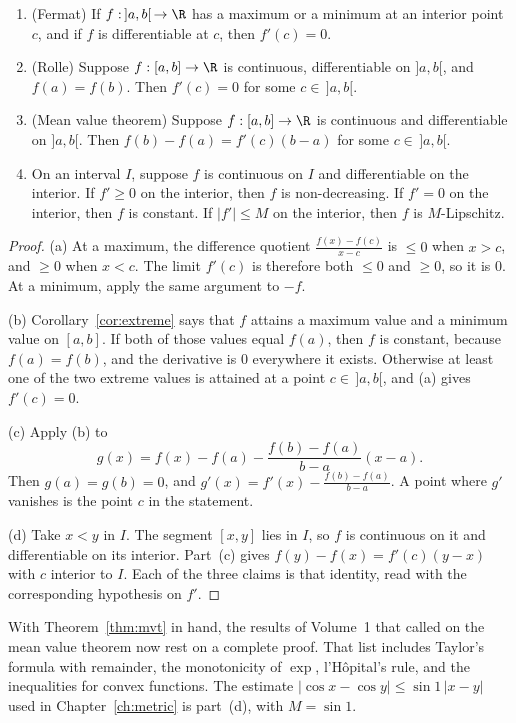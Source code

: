 \begin{theorem}\label{thm:mvt}
\begin{enumerate}[label=(\alph*)]
\item (Fermat) If $f:\,]a,b[\,\to\R$ has a maximum or a minimum at an interior point $c$, and if $f$ is differentiable at $c$, then $f'(c)=0$.
\item (Rolle) Suppose $f:[a,b]\to\R$ is continuous, differentiable on $]a,b[$, and $f(a)=f(b)$. Then $f'(c)=0$ for some $c\in\,]a,b[$.
\item (Mean value theorem) Suppose $f:[a,b]\to\R$ is continuous and differentiable on $]a,b[$. Then $f(b)-f(a)=f'(c)(b-a)$ for some $c\in\,]a,b[$.
\item On an interval $I$, suppose $f$ is continuous on $I$ and differentiable on the interior. If $f'\ge0$ on the interior, then $f$ is non-decreasing. If $f'=0$ on the interior, then $f$ is constant. If $|f'|\le M$ on the interior, then $f$ is $M$-Lipschitz.
\end{enumerate}
\end{theorem}
\begin{proof}
(a) At a maximum, the difference quotient $\frac{f(x)-f(c)}{x-c}$ is $\le0$ when $x>c$, and $\ge0$ when $x<c$. The limit $f'(c)$ is therefore both $\le0$ and $\ge0$, so it is $0$. At a minimum, apply the same argument to $-f$.

(b) Corollary~\ref{cor:extreme} says that $f$ attains a maximum value and a minimum value on $[a,b]$. If both of those values equal $f(a)$, then $f$ is constant, because $f(a)=f(b)$, and the derivative is $0$ everywhere it exists. Otherwise at least one of the two extreme values is attained at a point $c\in\,]a,b[$, and (a) gives $f'(c)=0$.

(c) Apply (b) to
\[g(x)=f(x)-f(a)-\frac{f(b)-f(a)}{b-a}(x-a).\]
Then $g(a)=g(b)=0$, and $g'(x)=f'(x)-\frac{f(b)-f(a)}{b-a}$. A point where $g'$ vanishes is the point $c$ in the statement.

(d) Take $x<y$ in $I$. The segment $[x,y]$ lies in $I$, so $f$ is continuous on it and differentiable on its interior. Part~(c) gives $f(y)-f(x)=f'(c)(y-x)$ with $c$ interior to $I$. Each of the three claims is that identity, read with the corresponding hypothesis on $f'$.
\end{proof}

With Theorem~\ref{thm:mvt} in hand, the results of Volume~1 that called on the mean value theorem now rest on a complete proof. That list includes Taylor's formula with remainder, the monotonicity of $\exp$, l'H\^opital's rule, and the inequalities for convex functions. The estimate $|\cos x-\cos y|\le\sin1\,|x-y|$ used in Chapter~\ref{ch:metric} is part~(d), with $M=\sin1$.

